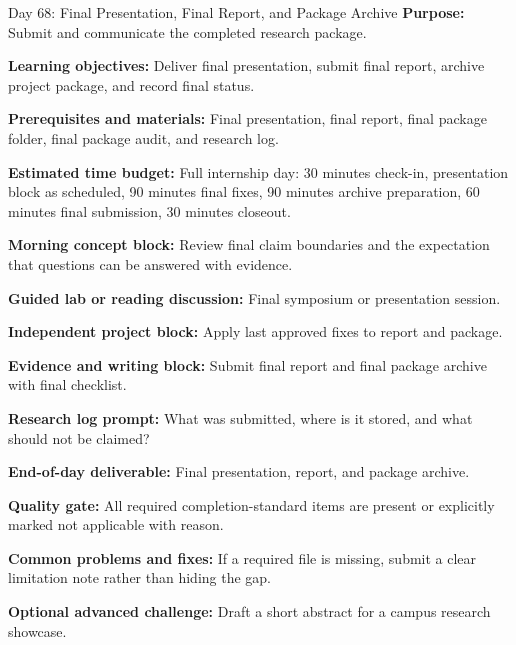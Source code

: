 \begin{dailybox}{Day 68: Final Presentation, Final Report, and Package Archive}
\textbf{Purpose:} Submit and communicate the completed research package.

\textbf{Learning objectives:} Deliver final presentation, submit final report, archive project package, and record final status.

\textbf{Prerequisites and materials:} Final presentation, final report, final package folder, final package audit, and research log.

\textbf{Estimated time budget:} Full internship day: 30 minutes check-in, presentation block as scheduled, 90 minutes final fixes, 90 minutes archive preparation, 60 minutes final submission, 30 minutes closeout.

\textbf{Morning concept block:} Review final claim boundaries and the expectation that questions can be answered with evidence.

\textbf{Guided lab or reading discussion:} Final symposium or presentation session.

\textbf{Independent project block:} Apply last approved fixes to report and package.

\textbf{Evidence and writing block:} Submit final report and final package archive with final checklist.

\textbf{Research log prompt:} What was submitted, where is it stored, and what should not be claimed?

\textbf{End-of-day deliverable:} Final presentation, report, and package archive.

\textbf{Quality gate:} All required completion-standard items are present or explicitly marked not applicable with reason.

\textbf{Common problems and fixes:} If a required file is missing, submit a clear limitation note rather than hiding the gap.

\textbf{Optional advanced challenge:} Draft a short abstract for a campus research showcase.
\end{dailybox}

